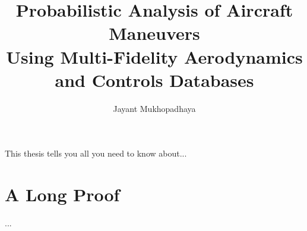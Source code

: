 \documentclass{report}
\begin{document}
\title{Probabilistic Analysis of Aircraft Maneuvers \\
            Using Multi-Fidelity Aerodynamics and Controls Databases}
\author{Jayant Mukhopadhaya}
 
\beforepreface
{}
This thesis tells you all you need to know about...


\afterpreface

% 

% 

% 

% 



% 


\appendix
\chapter{A Long Proof}
...


\end{document}
